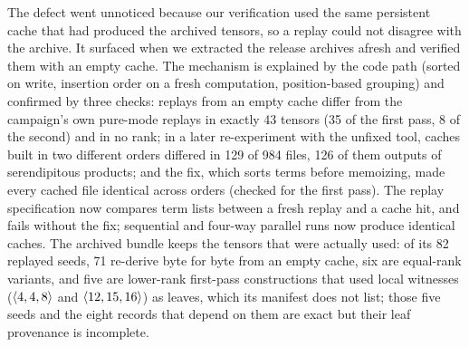 The defect went unnoticed because our verification used the same persistent cache that had produced the archived tensors, so a replay could not disagree with the archive. It surfaced when we extracted the release archives afresh and verified them with an empty cache.
The mechanism is explained by the code path (sorted on write, insertion order on a fresh computation, position-based grouping) and confirmed by three checks: replays from an empty cache differ from the campaign's own pure-mode replays in exactly 43 tensors (35 of the first pass, 8 of the second) and in no rank; in a later re-experiment with the unfixed tool, caches built in two different orders differed in 129 of 984 files, 126 of them outputs of serendipitous products; and the fix, which sorts terms
before memoizing, made every cached file identical across orders (checked for the first pass). The replay specification now compares term lists between a fresh replay and a cache hit, and fails without the fix; sequential and four-way parallel runs now produce identical caches.
The archived bundle keeps the tensors that were actually used: of its 82 replayed seeds, 71 re-derive byte for byte from an empty cache, six are equal-rank variants, and five are lower-rank first-pass constructions that used local witnesses ($\langle 4,4,8\rangle$ and $\langle 12,15,16\rangle$) as leaves, which its manifest does not list; those five seeds and the eight records that depend on them are exact but their leaf provenance is incomplete.

